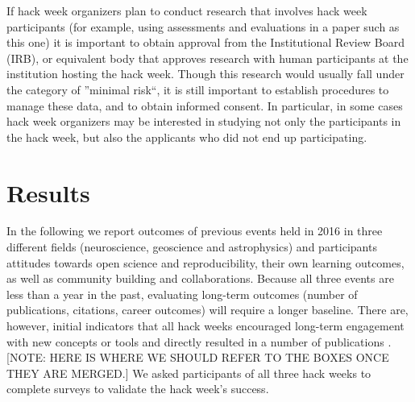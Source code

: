 If hack week organizers plan to conduct research that involves hack week participants (for example, using assessments and evaluations in a paper such as this one) it is important to obtain approval from the Institutional Review Board (IRB), or equivalent body that approves research with human participants at the institution hosting the hack week.
Though this research would usually fall under the category of ''minimal risk``, it is still important to establish procedures to manage these data, and to obtain informed consent.
In particular, in some cases hack week organizers may be interested in studying not only the participants in the hack week, but also the applicants who did not end up participating.

\section*{Results}

In the following we report outcomes of previous events held in 2016 in three different fields (neuroscience, geoscience and astrophysics) and participants attitudes towards open science and reproducibility, their own learning outcomes, as well as community building and collaborations.
Because all three events are less than a year in the past, evaluating long-term outcomes (number of publications, citations, career outcomes) will require a longer baseline.
There are, however, initial indicators that all hack weeks encouraged long-term engagement with new concepts or tools and directly resulted in a number of publications \cite{gullysantiago2015,faria2016,keshavan2017,leonard2017,jordan2017,peterson2017,hahn2017,pricewhelan2017}.
[NOTE: HERE IS WHERE WE SHOULD REFER TO THE BOXES ONCE THEY ARE MERGED.]
We asked participants of all three hack weeks to complete surveys to validate the hack week's success.

